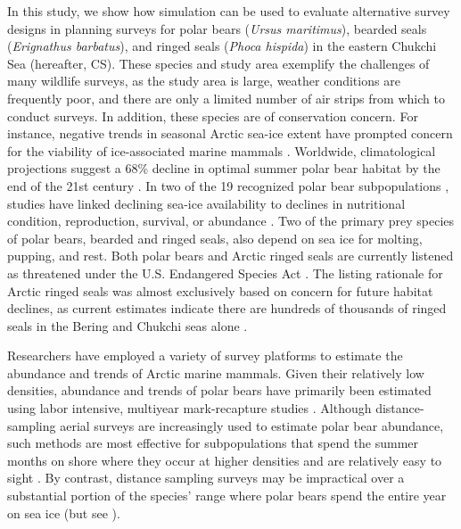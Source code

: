 \documentclass[]{rsos}%
\begin{document}
In this study, we show how simulation can be used to evaluate alternative survey designs in planning surveys for polar bears (\textit{Ursus maritimus}), bearded seals (\textit{Erignathus barbatus}), and ringed seals (\textit{Phoca hispida}) in the eastern Chukchi Sea (hereafter, CS).  These species and study area exemplify the challenges of many wildlife surveys, as the study area is large, weather conditions are frequently poor, and there are only a limited number of air strips from which to conduct surveys.  In addition, these species are of conservation concern.
For instance, negative trends in seasonal Arctic sea-ice extent \cite{Comiso2012} have prompted concern for the viability of ice-associated marine mammals \cite{LaidreEtAl2015}.  Worldwide, climatological projections suggest a 68\% decline in optimal summer polar bear habitat by the end of the 21st century \cite{DurnerEtAl2009}.  In two of the 19 recognized polar bear subpopulations \cite{ObbardEtAl2010}, studies have linked declining sea-ice availability to declines in nutritional condition, reproduction, survival, or abundance \cite{RegehrEtAl2007,RegehrEtAl2010,HunterEtAl2010,RodeEtAl2010,LunnEtAlInPress}.
Two of the primary prey species of polar bears, bearded and ringed seals, also depend on sea ice for molting, pupping, and rest.  Both polar bears and Arctic ringed seals are currently listened as threatened under the U.S. Endangered Species Act \cite{USFWS2008,NOAA2012}.  The listing rationale for Arctic ringed seals was almost exclusively based on concern for future habitat declines, as current estimates indicate there are hundreds of thousands of ringed seals in the Bering and Chukchi seas alone \cite{Bengtson2005,ConnEtAl2014}.

Researchers have employed a variety of survey platforms to estimate the abundance and trends of Arctic marine mammals.  Given their relatively low densities, abundance and trends of polar bears have primarily been estimated using labor intensive, multiyear mark-recapture studies \cite{BromaghinEtAl2015,RegehrEtAl2007,TaylorEtAl2008,PeacockEtAl2013}.  Although distance-sampling aerial surveys are increasingly used to estimate polar bear abundance, such methods are most effective for subpopulations that spend the summer months on shore where they occur at higher densities and are relatively easy to sight \cite{StapletonEtAl2014,ObbardEtAl2015}. By contrast, distance sampling surveys may be impractical over a substantial portion of the species' range where polar bears spend the entire year on sea ice (but see \cite{AarsEtAl2009}).
\end{document}
